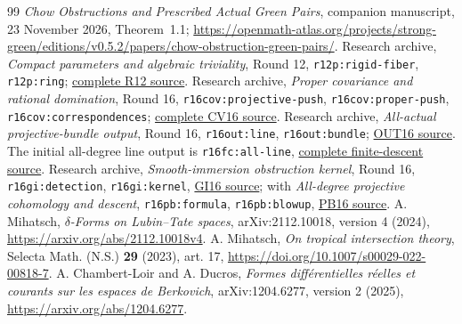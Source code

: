 \documentclass[11pt]{article}
\theoremstyle{definition}
\theoremstyle{remark}
\numberwithin{equation}{section}
\begin{document}
\begin{thebibliography}{99}
 \emph{Chow Obstructions and Prescribed Actual Green Pairs}, companion manuscript, 23 November 2026, Theorem~1.1; \url{https://openmath-atlas.org/projects/strong-green/editions/v0.5.2/papers/chow-obstruction-green-pairs/}.
 Research archive, \emph{Compact parameters and algebraic triviality}, Round 12, \texttt{r12p:rigid-fiber}, \texttt{r12p:ring}; \href{https://openmath-atlas.org/projects/strong-green/editions/v0.5.2/source-files/companion/proofs/foundations/R12_compact_parameter_algebraic_triviality.tex}{complete R12 source}.
 Research archive, \emph{Proper covariance and rational domination}, Round 16, \texttt{r16cov:projective-push}, \texttt{r16cov:proper-push}, \texttt{r16cov:correspondences}; \href{https://openmath-atlas.org/projects/strong-green/editions/v0.5.2/source-files/companion/proofs/foundations/R16_proper_covariance_and_rational_domination.tex}{complete CV16 source}.
 Research archive, \emph{All-actual projective-bundle output}, Round 16, \texttt{r16out:line}, \texttt{r16out:bundle}; \href{https://openmath-atlas.org/projects/strong-green/editions/v0.5.2/source-files/companion/proofs/foundations/R16_all_actual_projective_bundle_output.tex}{OUT16 source}. The initial all-degree line output is \texttt{r16fc:all-line}, \href{https://openmath-atlas.org/projects/strong-green/editions/v0.5.3/source-files/companion/proofs/foundations/R16_finite_descent_consequences.tex}{complete finite-descent source}.
 Research archive, \emph{Smooth-immersion obstruction kernel}, Round 16, \texttt{r16gi:detection}, \texttt{r16gi:kernel}, \href{https://openmath-atlas.org/projects/strong-green/editions/v0.5.2/source-files/companion/proofs/foundations/R16_smooth_immersion_obstruction_kernel.tex}{GI16 source}; with \emph{All-degree projective cohomology and descent}, \texttt{r16pb:formula}, \texttt{r16pb:blowup}, \href{https://openmath-atlas.org/projects/strong-green/editions/v0.5.2/source-files/companion/proofs/foundations/R16_all_degree_projective_cohomology_and_descent.tex}{PB16 source}.
 A. Mihatsch, \emph{$\delta$-Forms on Lubin--Tate spaces}, arXiv:2112.10018, version 4 (2024), \url{https://arxiv.org/abs/2112.10018v4}.
 A. Mihatsch, \emph{On tropical intersection theory}, Selecta Math. (N.S.) \textbf{29} (2023), art. 17, \url{https://doi.org/10.1007/s00029-022-00818-7}.
 A. Chambert-Loir and A. Ducros, \emph{Formes diff\'erentielles r\'eelles et courants sur les espaces de Berkovich}, arXiv:1204.6277, version 2 (2025), \url{https://arxiv.org/abs/1204.6277}.

\end{thebibliography}
\end{document}
